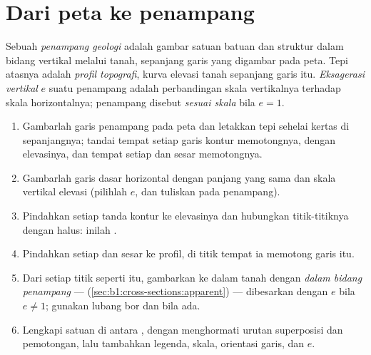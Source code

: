 \section{Dari peta ke penampang}

\begin{definition}\label{def:b1:cross-sections:section}
Sebuah \emph{penampang geologi} adalah gambar satuan batuan dan struktur dalam bidang vertikal melalui tanah, sepanjang garis yang digambar pada peta. Tepi atasnya adalah \emph{profil topografi}, kurva elevasi tanah sepanjang garis itu. \emph{Eksagerasi vertikal} $e$ suatu penampang adalah perbandingan skala vertikalnya terhadap skala horizontalnya; penampang disebut \emph{sesuai skala} bila $e = 1$.
\end{definition}

\begin{method}\label{met:b1:cross-sections:construct}
\begin{enumerate}
  \item Gambarlah garis penampang pada peta dan letakkan tepi sehelai kertas di sepanjangnya; tandai tempat setiap garis kontur memotongnya, dengan elevasinya, dan tempat setiap  dan sesar memotongnya.
  \item Gambarlah garis dasar horizontal dengan panjang yang sama dan skala vertikal elevasi (pilihlah $e$, dan tuliskan pada penampang).
  \item Pindahkan setiap tanda kontur ke elevasinya dan hubungkan titik-titiknya dengan halus: inilah .
  \item Pindahkan setiap  dan sesar ke profil, di titik tempat ia memotong garis itu.
  \item Dari setiap titik seperti itu, gambarkan  ke dalam tanah dengan  \emph{dalam bidang penampang} ---  (\cref{sec:b1:cross-sections:apparent}) --- dibesarkan dengan $e$ bila $e \ne 1$; gunakan lubang bor dan  bila ada.
  \item Lengkapi satuan di antara , dengan menghormati urutan superposisi dan pemotongan, lalu tambahkan legenda, skala, orientasi garis, dan $e$.
\end{enumerate}
\end{method}

